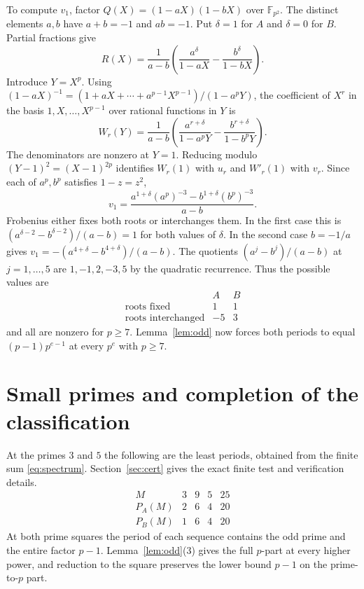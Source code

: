 \documentclass[11pt,letterpaper]{article}
\newcommand{\FF}{\mathbb F}
\begin{document}
To compute $v_1$, factor $Q(X)=(1-aX)(1-bX)$ over $\FF_{p^2}$. The
distinct elements $a,b$ have $a+b=-1$ and $ab=-1$. Put $\delta=1$ for $A$
and $\delta=0$ for $B$. Partial fractions give
\[
 R(X)=\frac{1}{a-b}\left(\frac{a^\delta}{1-aX}
                          -\frac{b^\delta}{1-bX}\right).
\]
Introduce $Y=X^p$. Using
$(1-aX)^{-1}=(1+aX+\cdots+a^{p-1}X^{p-1})/(1-a^pY)$,
the coefficient of $X^r$ in the basis $1,X,\ldots,X^{p-1}$ over rational
functions in $Y$ is
\[
 W_r(Y)=\frac{1}{a-b}\left(\frac{a^{r+\delta}}{1-a^pY}
                       -\frac{b^{r+\delta}}{1-b^pY}\right).
\]
The denominators are nonzero at $Y=1$. Reducing modulo
$(Y-1)^2=(X-1)^{2p}$ identifies $W_r(1)$ with $u_r$ and $W'_r(1)$
with $v_r$. Since each of $a^p,b^p$ satisfies $1-z=z^2$,
\[
 v_1=\frac{a^{1+\delta}(a^p)^{-3}-b^{1+\delta}(b^p)^{-3}}{a-b}.
\]
Frobenius either fixes both roots or interchanges them. In the first case
this is $(a^{\delta-2}-b^{\delta-2})/(a-b)=1$ for both values of $\delta$.
In the second case $b=-1/a$ gives
$v_1=-(a^{4+\delta}-b^{4+\delta})/(a-b)$.
The quotients $(a^j-b^j)/(a-b)$ at $j=1,\ldots,5$ are
$1,-1,2,-3,5$ by the quadratic recurrence. Thus the possible values are
\[
 \begin{array}{c|cc}
 & A & B\\ \hline
 \text{roots fixed} & 1 & 1\\
 \text{roots interchanged} & -5 & 3
 \end{array}
\]
and all are nonzero for $p\ge7$. Lemma~\ref{lem:odd} now forces both
periods to equal $(p-1)p^{e-1}$ at every $p^e$ with $p\ge7$.

\clearpage
\section{Small primes and completion of the classification}

At the primes $3$ and $5$ the following are the least periods, obtained
from the finite sum \eqref{eq:spectrum}. Section~\ref{sec:cert} gives the
exact finite test and verification details.
\[
\begin{array}{c|rrrr}
 M&3&9&5&25\\\hline
 P_A(M)&2&6&4&20\\
 P_B(M)&1&6&4&20
\end{array}
\]
At both prime squares the period of each sequence contains the odd prime and
the entire factor $p-1$. Lemma~\ref{lem:odd}(3) gives the full $p$-part at
every higher power, and reduction to the square preserves the lower bound
$p-1$ on the prime-to-$p$ part.
\end{document}
